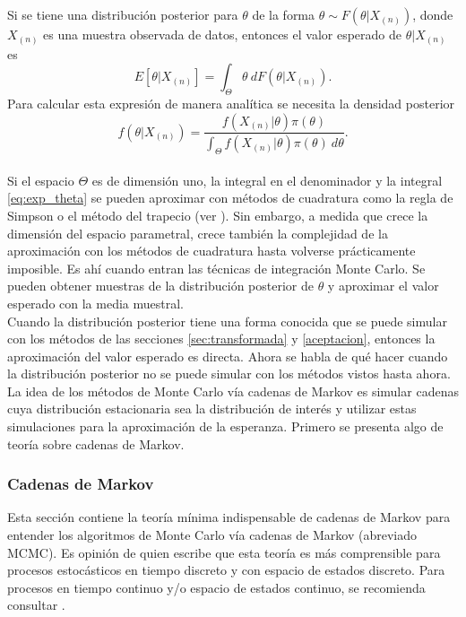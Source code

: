 \documentclass[11pt,a4paper]{article}
\begin{document}
Si se tiene una distribución posterior para $\theta$ de la forma $\theta \sim F(\theta | X_{(n)})$, donde $X_{(n)}$ es una muestra observada de datos, entonces el valor esperado de $\theta| X_{(n)}$ es
\begin{equation}
\label{eq:exp_theta}
E[\theta | X_{(n)}] = \int_{\Theta} \theta \ dF(\theta | X_{(n)}).
\end{equation}
Para calcular esta expresión de manera analítica se necesita la densidad posterior $$f(\theta | X_{(n)}) = \frac{f(X_{(n)} | \theta)\pi (\theta)}{\int_{\Theta} f(X_{(n)} | \theta)\pi (\theta) \ d\theta}.$$\\

Si el espacio $\Theta$ es de dimensión uno, la integral en el denominador y la integral \eqref{eq:exp_theta} se pueden aproximar con métodos de cuadratura como la regla de Simpson o el método del trapecio (ver \citet{burden}). Sin embargo, a medida que crece la dimensión del espacio parametral, crece también la complejidad de la aproximación con los métodos de cuadratura hasta volverse prácticamente imposible. Es ahí cuando entran las técnicas de integración Monte Carlo. Se pueden obtener muestras de la distribución posterior de $\theta$ y aproximar el valor esperado con la media muestral.\\

Cuando la distribución posterior tiene una forma conocida que se puede simular con los métodos de las secciones \ref{sec:transformada} y \ref{aceptacion}, entonces la aproximación del valor esperado es directa. Ahora se habla de qué hacer cuando la distribución posterior no se puede simular con los métodos vistos hasta ahora. La idea de los métodos de Monte Carlo vía cadenas de Markov es simular cadenas cuya distribución estacionaria sea la distribución de interés y utilizar estas simulaciones para la aproximación de la esperanza. Primero se presenta algo de teoría sobre cadenas de Markov.\\

\subsubsection*{Cadenas de Markov}
Esta sección contiene la teoría mínima indispensable de cadenas de Markov para entender los algoritmos de Monte Carlo vía cadenas de Markov (abreviado MCMC). Es opinión de quien escribe que esta teoría es más comprensible para procesos estocásticos en tiempo discreto y con espacio de estados discreto. Para procesos en tiempo continuo y/o espacio de estados continuo, se recomienda consultar \citet{ross}.\\
\end{document}
